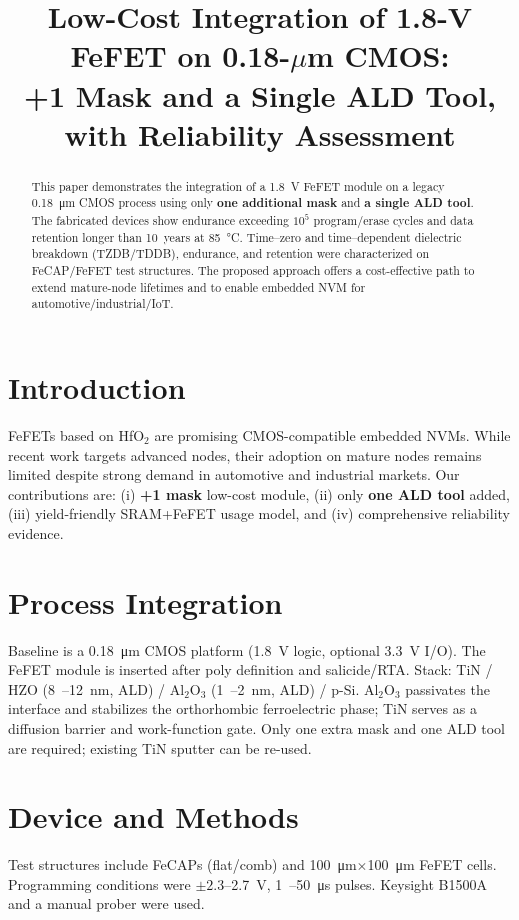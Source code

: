 \documentclass[conference]{IEEEtran}
\title{Low-Cost Integration of 1.8-V FeFET on 0.18-\(\mu\)m CMOS:\\
+1 Mask and a Single ALD Tool, with Reliability Assessment}
\author{\IEEEauthorblockN{Shinichi Samizo}
\IEEEauthorblockA{Independent Researcher}
}
\begin{document}
\maketitle

\begin{abstract}
This paper demonstrates the integration of a \SI{1.8}{V} FeFET module on a legacy \SI{0.18}{\micro m} CMOS process using only \textbf{one additional mask} and \textbf{a single ALD tool}. 
The fabricated devices show endurance exceeding \(10^{5}\) program/erase cycles and data retention longer than 10~years at \SI{85}{\celsius}. 
Time–zero and time–dependent dielectric breakdown (TZDB/TDDB), endurance, and retention were characterized on FeCAP/FeFET test structures. 
The proposed approach offers a cost-effective path to extend mature-node lifetimes and to enable embedded NVM for automotive/industrial/IoT.
\end{abstract}

\section{Introduction}
FeFETs based on HfO\(_2\) are promising CMOS-compatible embedded NVMs. 
While recent work targets advanced nodes, their adoption on mature nodes remains limited despite strong demand in automotive and industrial markets. 
Our contributions are: (i) \textbf{+1 mask} low-cost module, (ii) only \textbf{one ALD tool} added, (iii) yield-friendly SRAM+FeFET usage model, and (iv) comprehensive reliability evidence.

\section{Process Integration}
Baseline is a \SI{0.18}{\micro m} CMOS platform (\SI{1.8}{V} logic, optional \SI{3.3}{V} I/O). 
The FeFET module is inserted after poly definition and salicide/RTA. 
Stack: TiN / HZO (\SI{8}{–}\SI{12}{nm}, ALD) / Al\(_2\)O\(_3\) (\SI{1}{–}\SI{2}{nm}, ALD) / p-Si. 
Al\(_2\)O\(_3\) passivates the interface and stabilizes the orthorhombic ferroelectric phase; TiN serves as a diffusion barrier and work-function gate. 
Only one extra mask and one ALD tool are required; existing TiN sputter can be re-used.

\section{Device and Methods}
Test structures include FeCAPs (flat/comb) and \SI{100}{\micro m}\(\times\)\SI{100}{\micro m} FeFET cells.
Programming conditions were \(\pm 2.3\)–\SI{2.7}{V}, \SI{1}{–}\SI{50}{\micro s} pulses. 
Keysight B1500A and a manual prober were used.
\end{document}
